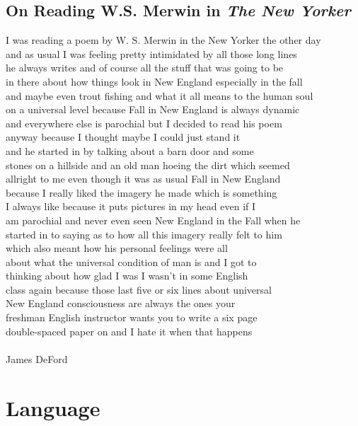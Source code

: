 \documentclass[letterpaper,oneside]{memoir}
\begin{document}
\begin{description}
\section[A Parable of Envy]{On Reading W.S. Merwin in \textit{The New Yorker}}
I was reading a poem by W. S. Merwin in the New Yorker the other day\\
and as usual I was feeling pretty intimidated by all those long lines\\
he always writes and of course all the stuff that was going to be\\
in there about how things look in New England especially in the fall\\
and maybe even trout fishing and what it all means to the human soul\\ on a
universal level because Fall in New England is always dynamic\\
and everywhere else is parochial but I decided to read his poem\\
anyway because I thought maybe I could just stand it\\
and he started in by talking about a barn door and some \\
stones on a hillside and an old man hoeing the dirt which seemed\\
allright to me even though it was as usual Fall in New England\\
because I really liked the imagery he made which is something\\
I always like because it puts pictures in my head even if I\\
am parochial and never even seen New England in the Fall when he\\
started in to saying as to how all this imagery really felt to him\\
which also meant how his personal feelings were all\\
about what the universal condition of man is and I got to \\
thinking about how glad I was I wasn't in some English\\
class again because those last five or six lines about universal\\
New England consciousness are always the ones your\\
freshman English instructor wants you to write a six page\\
double-spaced paper on and I hate it when that happens\\
\\James DeFord
\chapter{Language}
\begin{epigraphs}
\\
\end{epigraphs}

\end{description}
\end{document}

